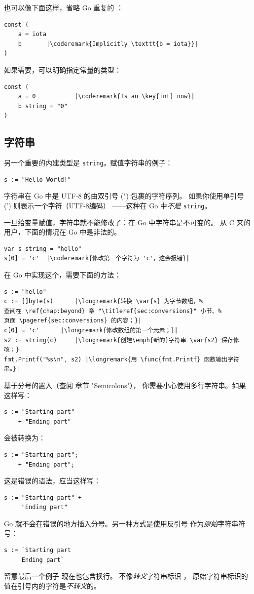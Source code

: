 也可以像下面这样，省略 Go 重复的 ：
\begin{lstlisting}
const (
	a = iota
	b	    |\coderemark{Implicitly \texttt{b = iota}}|
)
\end{lstlisting}
如果需要，可以明确指定常量的类型：
\begin{lstlisting}
const (
	a = 0           |\coderemark{Is an \key{int} now}|
	b string = "0" 
)
\end{lstlisting}

\subsection{字符串}
另一个重要的内建类型是 \lstinline{string}。赋值字符串的例子：
\begin{lstlisting}
s := "Hello World!"
\end{lstlisting}
字符串在 Go 中是 UTF-8 的由双引号 (") 包裹的字符序列。
如果你使用单引号 (') 则表示一个字符（UTF-8编码）
——这种在 Go 中\emph{不是} \lstinline{string}。

一旦给变量赋值，字符串就不能修改了：在 Go 中字符串是不可变的。
从 C 来的用户，下面的情况在 Go 中是非法的。
\begin{lstlisting}
var s string = "hello"
s[0] = 'c'  |\coderemark{修改第一个字符为 'c'，这会报错}|
\end{lstlisting}
在 Go 中实现这个，需要下面的方法：
\begin{lstlisting}
s := "hello"
c := []byte(s)	    |\longremark{转换 \var{s} 为字节数组，%
查阅在 \ref{chap:beyond} 章 "\titleref{sec:conversions}" 小节、%
页面 \pageref{sec:conversions} 的内容；}|
c[0] = 'c'	    |\longremark{修改数组的第一个元素；}|
s2 := string(c)     |\longremark{创建\emph{新的}字符串 \var{s2} 保存修改；}|
fmt.Printf("%s\n", s2) |\longremark{用 \func{fmt.Printf} 函数输出字符串。}|
\end{lstlisting}
\showremarks

\begin{lbar}[多行字符串]
基于分号的置入（查阅 \cite{effective_go} 章节 "Semicolons"），
你需要小心使用多行字符串。如果这样写：
\begin{lstlisting}
s := "Starting part"
    + "Ending part"
\end{lstlisting}
会被转换为：
\begin{lstlisting}
s := "Starting part";
    + "Ending part";
\end{lstlisting}
这是错误的语法，应当这样写：
\begin{lstlisting}
s := "Starting part" +
     "Ending part"
\end{lstlisting}
Go 就不会在错误的地方插入分号。另一种方式是使用反引号  作为\emph{原始}字符串符号：
\begin{lstlisting}
s := `Starting part
     Ending part`
\end{lstlisting}
留意最后一个例子  现在也包含换行。
不像\emph{转义}字符串标识  ，
原始字符串标识的值在引号内的字符是\emph{不转义}的。
\end{lbar}
